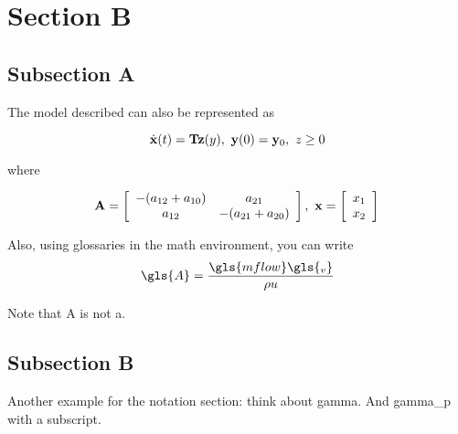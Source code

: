 \section{Section B}
\label{sec:sectionb}

\subsection{Subsection A}
\label{subsec:subasectionB}

The model described can also be represented as

\begin{equation}
\dot{\mathbf{x}}(t) = \mathbf{T}\mathbf{z}(y),\  \mathbf{y}(0) = \mathbf{y}_0,\  z\geq 0 \\
\label{eq:dummyeq1}
\end{equation}

\noindent where

\begin{equation}
\mathbf{A} = \left[ \begin{array}{cc} -(a_{12} + a_{10}) & a_{21} \\ a_{12} & -(a_{21} + a_{20}) \end{array} \right],\ \mathbf{x} = \left[ \begin{array}{c} x_1 \\ x_2 \end{array} \right] \\
\label{eq:dummyeq2}
\end{equation}

Also, using glossaries in the math environment, you can write
\begin{equation}
\gls{A} = \frac{\gls{mflow}\gls{_v}}{\rho u}
\label{eq:dummyeq3}
\end{equation}

Note that \gls{A} is not \gls{a}.


\subsection{Subsection B}
\label{subsec:subbsectionB}

Another example for the notation section: think about \gls{gamma}.
And \gls{gamma}\gls{_p} with a subscript.

